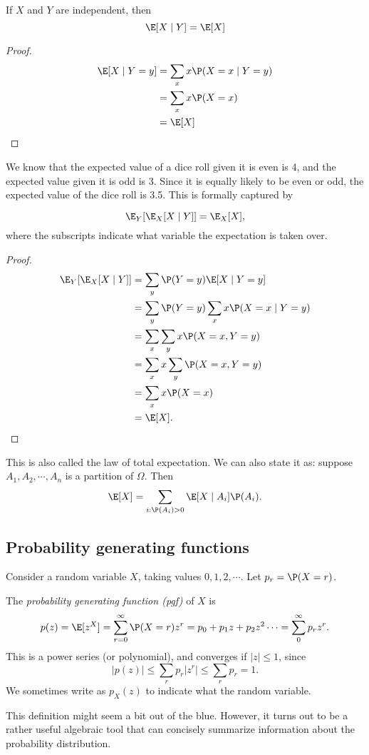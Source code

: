 \documentclass[a4paper]{article}
\begin{document}
\begin{thm}
  If $X$ and $Y$ are independent, then
  \[
    \E[X\mid Y] = \E[X]
  \]
\end{thm}

\begin{proof}
  \begin{align*}
    \E[X\mid Y = y] &= \sum_{x}x\P(X = x\mid Y = y)\\
    &= \sum_x x\P(X = x)\\
    &= \E[X]\qedhere
  \end{align*}
\end{proof}

We know that the expected value of a dice roll given it is even is 4, and the expected value given it is odd is 3. Since it is equally likely to be even or odd, the expected value of the dice roll is 3.5. This is formally captured by
\begin{thm}
  \[
    \E_Y[\E_X[X\mid Y]] = \E_X[X],
  \]
  where the subscripts indicate what variable the expectation is taken over.
\end{thm}

\begin{proof}
  \begin{align*}
    \E_Y[\E_X[X\mid Y]] &= \sum_y \P(Y = y)\E[X\mid Y = y]\\
    &= \sum _y \P(Y = y) \sum_{x}x\P(X = x\mid Y = y)\\
    &= \sum_x\sum_y x\P(X = x, Y = y)\\
    &= \sum _x x\sum_y \P(X = x, Y = y)\\
    &= \sum_x x\P(X = x)\\
    &= \E[X].\qedhere
  \end{align*}
\end{proof}
This is also called the law of total expectation. We can also state it as: suppose $A_1, A_2, \cdots, A_n$ is a partition of $\Omega$. Then
\[
  \E[X] = \sum_{i: \P(A_i) > 0}\E[X\mid A_i]\P(A_i).
\]

\subsection{Probability generating functions}
Consider a random variable $X$, taking values $0, 1, 2, \cdots$. Let $p_r = \P(X = r)$.
\begin{defi}
  The \emph{probability generating function (pgf)} of $X$ is
  \[
    p(z) = \E[z^X] = \sum_{r = 0}^\infty \P(X = r)z^r = p_0 + p_1z + p_2z^2\cdots = \sum_0^\infty p_rz^r.
  \]
  This is a power series (or polynomial), and converges if $|z| \leq 1$, since
  \[
    |p(z)| \leq \sum_r p_r |z^r| \leq \sum_r p_r = 1.
  \]
  We sometimes write as $p_X(z)$ to indicate what the random variable.
\end{defi}
This definition might seem a bit out of the blue. However, it turns out to be a rather useful algebraic tool that can concisely summarize information about the probability distribution.
\end{document}
